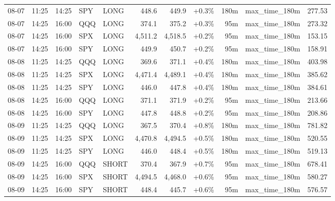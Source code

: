 \documentclass[11pt,a4paper,twoside]{article}
\begin{document}
\begin{center}
\begin{longtable}{>{\color{txtmain}}l l l l l r r r r >{\color{txtmain}}l r}
08-07 & 11:25 & 14:25 & SPY & LONG & 448.6 & 449.9 & \textcolor{wingreen}{+0.3\%} & 180m & max\_time\_180m & \textcolor{wingreen}{277.53} \\
08-07 & 14:25 & 16:00 & QQQ & LONG & 374.1 & 375.2 & \textcolor{wingreen}{+0.3\%} & 95m & max\_time\_180m & \textcolor{wingreen}{273.32} \\
08-07 & 14:25 & 16:00 & SPX & LONG & 4,511.2 & 4,518.5 & \textcolor{wingreen}{+0.2\%} & 95m & max\_time\_180m & \textcolor{wingreen}{153.15} \\
08-07 & 14:25 & 16:00 & SPY & LONG & 449.9 & 450.7 & \textcolor{wingreen}{+0.2\%} & 95m & max\_time\_180m & \textcolor{wingreen}{158.91} \\
08-08 & 11:25 & 14:25 & QQQ & LONG & 369.6 & 371.1 & \textcolor{wingreen}{+0.4\%} & 180m & max\_time\_180m & \textcolor{wingreen}{403.98} \\
08-08 & 11:25 & 14:25 & SPX & LONG & 4,471.4 & 4,489.1 & \textcolor{wingreen}{+0.4\%} & 180m & max\_time\_180m & \textcolor{wingreen}{385.62} \\
08-08 & 11:25 & 14:25 & SPY & LONG & 446.0 & 447.8 & \textcolor{wingreen}{+0.4\%} & 180m & max\_time\_180m & \textcolor{wingreen}{384.61} \\
08-08 & 14:25 & 16:00 & QQQ & LONG & 371.1 & 371.9 & \textcolor{wingreen}{+0.2\%} & 95m & max\_time\_180m & \textcolor{wingreen}{213.66} \\
08-08 & 14:25 & 16:00 & SPY & LONG & 447.8 & 448.8 & \textcolor{wingreen}{+0.2\%} & 95m & max\_time\_180m & \textcolor{wingreen}{208.86} \\
08-09 & 11:25 & 14:25 & QQQ & LONG & 367.5 & 370.4 & \textcolor{wingreen}{+0.8\%} & 180m & max\_time\_180m & \textcolor{wingreen}{781.82} \\
08-09 & 11:25 & 14:25 & SPX & LONG & 4,470.8 & 4,494.5 & \textcolor{wingreen}{+0.5\%} & 180m & max\_time\_180m & \textcolor{wingreen}{520.55} \\
08-09 & 11:25 & 14:25 & SPY & LONG & 446.0 & 448.4 & \textcolor{wingreen}{+0.5\%} & 180m & max\_time\_180m & \textcolor{wingreen}{519.13} \\
08-09 & 14:25 & 16:00 & QQQ & SHORT & 370.4 & 367.9 & \textcolor{wingreen}{+0.7\%} & 95m & max\_time\_180m & \textcolor{wingreen}{678.41} \\
08-09 & 14:25 & 16:00 & SPX & SHORT & 4,494.5 & 4,468.0 & \textcolor{wingreen}{+0.6\%} & 95m & max\_time\_180m & \textcolor{wingreen}{580.27} \\
08-09 & 14:25 & 16:00 & SPY & SHORT & 448.4 & 445.7 & \textcolor{wingreen}{+0.6\%} & 95m & max\_time\_180m & \textcolor{wingreen}{576.57} \\

\end{longtable}
\end{center}
\end{document}
